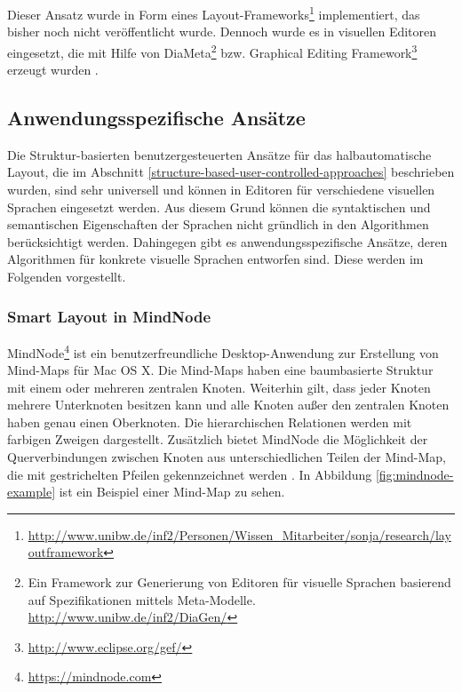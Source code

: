



Dieser Ansatz wurde in Form eines Layout-Frameworks\footnote{\url{http://www.unibw.de/inf2/Personen/Wissen_Mitarbeiter/sonja/research/layoutframework}} implementiert, das bisher noch nicht veröffentlicht wurde. Dennoch wurde es in visuellen Editoren eingesetzt, die mit Hilfe von DiaMeta\footnote{Ein Framework zur Generierung von Editoren für visuelle Sprachen basierend auf Spezifikationen mittels Meta-Modelle. \url{http://www.unibw.de/inf2/DiaGen/}} bzw. Graphical Editing Framework\footnote{\url{http://www.eclipse.org/gef/}} erzeugt wurden \cite{Maier12A-Pattern-based}.

\subsection{Anwendungsspezifische Ansätze}

Die Struktur-basierten benutzergesteuerten Ansätze für das halbautomatische Layout, die im Abschnitt \ref{structure-based-user-controlled-approaches} beschrieben wurden, sind sehr universell und können in Editoren für verschiedene visuellen Sprachen eingesetzt werden. Aus diesem Grund können die syntaktischen und semantischen Eigenschaften der Sprachen nicht gründlich in den Algorithmen berücksichtigt werden. Dahingegen gibt es anwendungsspezifische Ansätze, deren Algorithmen für konkrete visuelle Sprachen entworfen sind. Diese werden im Folgenden vorgestellt.

\subsubsection{Smart Layout in MindNode}

MindNode\footnote{\url{https://mindnode.com}} ist ein benutzerfreundliche Desktop-Anwendung zur Erstellung von Mind-Maps für Mac OS X. Die Mind-Maps haben eine baumbasierte Struktur mit einem oder mehreren zentralen Knoten. Weiterhin gilt, dass jeder Knoten mehrere Unterknoten besitzen kann und alle Knoten außer den zentralen Knoten haben genau einen Oberknoten. Die hierarchischen Relationen werden mit farbigen Zweigen dargestellt. Zusätzlich bietet MindNode die Möglichkeit der Querverbindungen zwischen Knoten aus unterschiedlichen Teilen der Mind-Map, die mit gestrichelten Pfeilen gekennzeichnet werden \cite{14MindNode}. In Abbildung \ref{fig:mindnode-example} ist ein Beispiel einer Mind-Map zu sehen.

